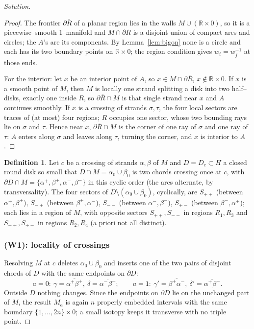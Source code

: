 \documentclass{amsart}
\theoremstyle{definition}
\newtheorem{definition}{Definition}
\newcommand{\RR}{\mathbb{R}}
\newcommand{\bdy}{\partial}
\begin{document}
\begin{proof}[Solution]
\begin{proof}
The frontier $\bdy\overline R$ of a planar region lies in the walls $M\cup(\RR\times0)$, so it is
a piecewise–smooth $1$–manifold and $M\cap\bdy\overline R$ is a disjoint union of compact arcs
and circles; the $A$'s are its components. By Lemma~\ref{lem:bigon} none is a circle and each has
its two boundary points on $\RR\times0$; the region condition gives $w_i=w_j^{-1}$ at those ends.

For the interior: let $x$ be an interior point of $A$, so $x\in M\cap\bdy\overline R$,
$x\notin\RR\times0$. If $x$ is a smooth point of $M$, then $M$ is locally one strand splitting a
disk into two half–disks, exactly one inside $R$, so $\bdy\overline R\cap M$ is that single
strand near $x$ and $A$ continues smoothly. If $x$ is a crossing of strands $\sigma,\tau$, the
four local sectors are traces of (at most) four regions; $R$ occupies one sector, whose two
bounding rays lie on $\sigma$ and $\tau$. Hence near $x$, $\bdy\overline R\cap M$ is the corner
of one ray of $\sigma$ and one ray of $\tau$: $A$ enters along $\sigma$ and leaves along $\tau$,
turning the corner, and $x$ is interior to $A$.
\end{proof}

\begin{definition}\label{def:corners}
Let $c$ be a crossing of strands $\alpha,\beta$ of $M$ and $D=D_c\subset H$ a closed round disk
so small that $D\cap M=\alpha_0\cup\beta_0$ is two chords crossing once at $c$, with
$\bdy D\cap M=\{\alpha^+,\beta^+,\alpha^-,\beta^-\}$ in this cyclic order (the arcs alternate,
by transversality). The four sectors of $D\setminus(\alpha_0\cup\beta_0)$, cyclically, are
$S_{++}$ (between $\alpha^+,\beta^+$), $S_{-+}$ (between $\beta^+,\alpha^-$),
$S_{--}$ (between $\alpha^-,\beta^-$), $S_{+-}$ (between $\beta^-,\alpha^+$); each lies in a
region of $M$, with opposite sectors $S_{++},S_{--}$ in regions $R_1,R_3$ and $S_{-+},S_{+-}$ in
regions $R_2,R_4$ (a priori not all distinct).
\end{definition}

\subsubsection{(W1): locality of crossings}\label{ssec:W1}

Resolving $M$ at $c$ deletes $\alpha_0\cup\beta_0$ and inserts one of the two pairs of disjoint
chords of $D$ with the same endpoints on $\bdy D$:
\[
  a{=}0:\ \gamma=\overline{\alpha^+\beta^+},\ \delta=\overline{\alpha^-\beta^-};
  \qquad
  a{=}1:\ \gamma'=\overline{\beta^+\alpha^-},\ \delta'=\overline{\alpha^+\beta^-}.
\]
Outside $D$ nothing changes. Since the endpoints on $\bdy D$ lie on the unchanged part of $M$,
the result $M_a$ is again $n$ properly embedded intervals with the same boundary
$\{1,\dots,2n\}\times0$; a small isotopy keeps it transverse with no triple point.


\end{proof}
\end{document}
